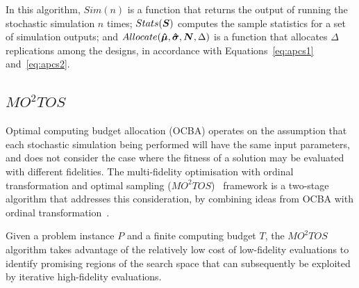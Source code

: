 \documentclass[journal]{IEEEtran}
\begin{document}
\begin{algorithm}[h!] 
\caption{$OCBA$}
\label{alg:ocba}
{\footnotesize
\begin{algorithmic}[1]
 
 
 
\label{while-loop}
   
   
   
   
   
\ENDWHILE
\end{algorithmic}
}
\end{algorithm}

In this algorithm, $Sim(n)$ is a function that returns the output of running the stochastic simulation $n$ times; $Stats(\boldsymbol{S})$ computes the sample statistics for a set of simulation outputs; and $Allocate(\boldsymbol{\hat{\mu}},\boldsymbol{\hat{\sigma}},\boldsymbol{N},\Delta)$ is a function that allocates $\Delta$ replications among the designs, in accordance with Equations~\ref{eq:apcs1} and~\ref{eq:apcs2}.

\subsection{$MO^2TOS$}
Optimal computing budget allocation (OCBA) operates on the assumption that each stochastic simulation being performed will have the same input parameters, and does not consider the case where the fitness of a solution may be evaluated with different fidelities. The multi-fidelity optimisation with ordinal transformation and optimal sampling ($MO^2TOS$)~\cite{xu2016mo2tos} framework is a two-stage algorithm that addresses this consideration, by combining ideas from OCBA with ordinal transformation~\cite{xu2014ordinal}.

Given a problem instance $P$ and a finite computing budget $T$, the $MO^2TOS$ algorithm takes advantage of the relatively low cost of low-fidelity evaluations to identify promising regions of the search space that can subsequently be exploited by iterative high-fidelity evaluations.
\end{document}
